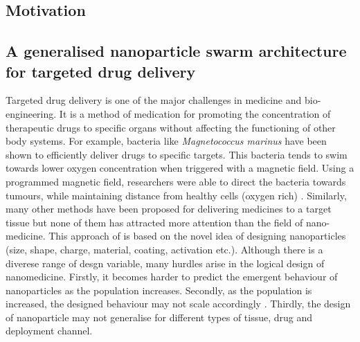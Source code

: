 \documentclass[11pt,a4paper]{article}
\begin{document}
\newpage
\begin{center}
\section{Motivation}\label{motivation}
\end{center}
\begin{multicols}{2}
\subsection{A generalised nanoparticle swarm architecture for targeted drug delivery}\label{gen}
Targeted drug delivery is one of the major challenges in medicine and bio-engineering. It is a method of medication for promoting the concentration of therapeutic drugs to specific organs without affecting the functioning of other body systems\cite{muller2004challenges}. For example, bacteria like \emph{Magnetococcus marinus} have been shown to efficiently deliver drugs to specific targets. This bacteria tends to swim towards lower oxygen concentration when triggered with a magnetic field. Using a programmed magnetic field, researchers were able to direct the bacteria towards tumours, while maintaining distance from healthy cells (oxygen rich) \cite{felfoul2016magneto}. Similarly, many other methods have been proposed for delivering medicines to a target tissue but none of them has attracted more attention than the field of nano-medicine\cite{farokhzad2009impact}. This approach of is based on the novel idea of designing nanoparticles (size, shape, charge, material, coating, activation etc.). Although there is a diverese range of desgn variable, many hurdles arise in the logical design of nanomedicine. Firstly, it becomes harder to predict the emergent behaviour of nanoparticles as the population increases. Secondly, as the population
is increased, the designed behaviour may not scale accordingly \cite{chowdhury2015controlling}\cite{kim2015imparting}. Thirdly, the design of nanoparticle may not generalise for different types of tissue, drug and deployment channel\cite{li2011mathematical}. 


\end{multicols}
\end{document}
